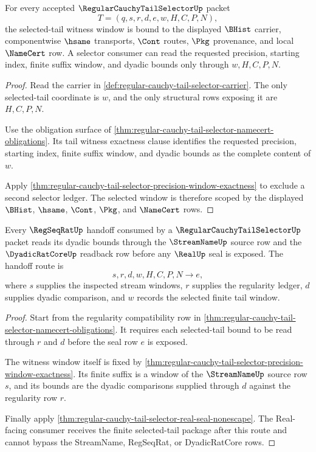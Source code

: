 \begin{theorem}
\label{thm:regular-cauchy-tail-selector-scope-window}
For every accepted $\RegularCauchyTailSelectorUp$ packet
$$
T=(q,s,r,d,e,w,H,C,P,N),
$$
the selected-tail witness window is bound to the displayed $\BHist$ carrier,
componentwise $\hsame$ transports, $\Cont$ routes, $\Pkg$ provenance, and local
$\NameCert$ row. A selector consumer can read the requested precision, starting
index, finite suffix window, and dyadic bounds only through $w,H,C,P,N$.
\end{theorem}
\begin{proof}
Read the carrier in \autoref{def:regular-cauchy-tail-selector-carrier}. The
only selected-tail coordinate is $w$, and the only structural rows exposing it
are $H,C,P,N$.

Use the obligation surface of
\autoref{thm:regular-cauchy-tail-selector-namecert-obligations}. Its tail
witness exactness clause identifies the requested precision, starting index,
finite suffix window, and dyadic bounds as the complete content of $w$.

Apply \autoref{thm:regular-cauchy-tail-selector-precision-window-exactness} to
exclude a second selector ledger. The selected window is therefore scoped by the
displayed $\BHist$, $\hsame$, $\Cont$, $\Pkg$, and $\NameCert$ rows.
\end{proof}

\begin{theorem}
\label{thm:regular-cauchy-tail-selector-regseqrat-handoff}
Every $\RegSeqRatUp$ handoff consumed by a $\RegularCauchyTailSelectorUp$ packet
reads its dyadic bounds through the $\StreamNameUp$ source row and the
$\DyadicRatCoreUp$ readback row before any $\RealUp$ seal is exposed. The
handoff route is
$$
s,r,d,w,H,C,P,N \to e,
$$
where $s$ supplies the inspected stream windows, $r$ supplies the regularity
ledger, $d$ supplies dyadic comparison, and $w$ records the selected finite
tail window.
\end{theorem}
\begin{proof}
Start from the regularity compatibility row in
\autoref{thm:regular-cauchy-tail-selector-namecert-obligations}. It requires
each selected-tail bound to be read through $r$ and $d$ before the seal row $e$
is exposed.

The witness window itself is fixed by
\autoref{thm:regular-cauchy-tail-selector-precision-window-exactness}. Its
finite suffix is a window of the $\StreamNameUp$ source row $s$, and its bounds
are the dyadic comparisons supplied through $d$ against the regularity row $r$.

Finally apply \autoref{thm:regular-cauchy-tail-selector-real-seal-nonescape}.
The Real-facing consumer receives the finite selected-tail package after this
route and cannot bypass the StreamName, RegSeqRat, or DyadicRatCore rows.
\end{proof}

